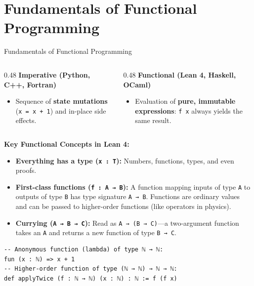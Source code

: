 \documentclass[aspectratio=169, 10pt]{beamer}
\begin{document}
\section{Fundamentals of Functional Programming}

\begin{frame}[fragile]{Fundamentals of Functional Programming}
  \begin{columns}[T]
    \begin{column}{0.48\textwidth}
      \textbf{Imperative (Python, C++, Fortran)}
      \begin{itemize}
        \item Sequence of \textbf{state mutations} (\texttt{x = x + 1}) and in-place side effects.
      \end{itemize}
    \end{column}

    \begin{column}{0.48\textwidth}
      \textbf{Functional (Lean 4, Haskell, OCaml)}
      \begin{itemize}
        \item Evaluation of \textbf{pure, immutable expressions}: \texttt{f x} always yields the same result.
      \end{itemize}
    \end{column}
  \end{columns}

  \vspace{0.15cm}
  \textbf{Key Functional Concepts in Lean 4:}
  \begin{itemize}
    \item \textbf{Everything has a type (\texttt{x : T}):} Numbers, functions, types, and even proofs.
    \item \textbf{First-class functions (\texttt{f : A → B}):} A function mapping inputs of type \texttt{A} to outputs of type \texttt{B} has type signature \texttt{A → B}. Functions are ordinary values and can be passed to higher-order functions (like operators in physics).
    \item \textbf{Currying (\texttt{A → B → C}):} Read as \texttt{A → (B → C)}---a two-argument function takes an \texttt{A} and returns a new function of type \texttt{B → C}.
  \end{itemize}

\begin{lstlisting}[language=Lean4]
-- Anonymous function (lambda) of type ℕ → ℕ:
fun (x : ℕ) => x + 1
-- Higher-order function of type (ℕ → ℕ) → ℕ → ℕ:
def applyTwice (f : ℕ → ℕ) (x : ℕ) : ℕ := f (f x)
\end{lstlisting}
\end{frame}
\end{document}
